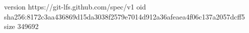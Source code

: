 version https://git-lfs.github.com/spec/v1
oid sha256:8172c3aa436869d15da3038f2579e7014d912a36afeaea4f06c137a2057dcff5
size 349692
